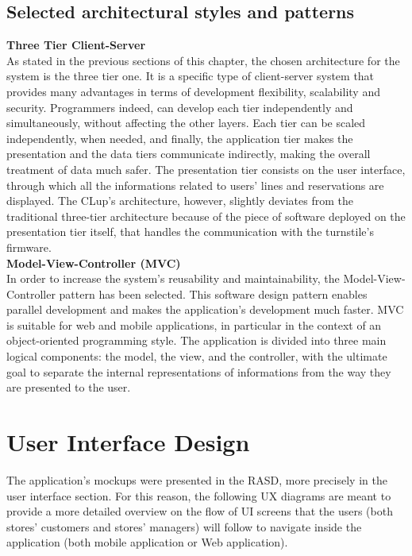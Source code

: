 \documentclass{article}
\begin{document}
\subsection{Selected architectural styles and patterns}

\noindent\textbf{Three Tier Client-Server}\\

\noindent As stated in the previous sections of this chapter, the chosen architecture for the system is the three tier one. It is a specific type of client-server system that provides many advantages in terms of development flexibility, scalability and security. Programmers indeed, can develop each tier independently and simultaneously, without affecting the other layers. Each tier can be scaled independently, when needed, and finally, the application tier makes the presentation and the data tiers communicate indirectly, making the overall treatment of data much safer. The presentation tier consists on the user interface, through which all the informations related to users’ lines and reservations are displayed. The CLup’s architecture, however, slightly deviates from the traditional three-tier architecture because of the piece of software deployed on the presentation tier itself, that handles the communication with the turnstile’s firmware.\\

\textbf{Model-View-Controller (MVC)}\\

\noindent In order to increase the system’s reusability and maintainability, the Model-View-Controller pattern has been selected. This software design pattern enables parallel development and makes the application’s development much faster. MVC is suitable for web and mobile applications, in particular in the context of an object-oriented programming style. The application is divided into three main logical components: the model, the view, and the controller, with the ultimate goal to separate the internal representations of informations from the way they are presented to the user.




\section{User Interface Design}
The application's mockups were presented in the RASD, more precisely in the user interface section. For this reason, the following UX diagrams are meant to provide a more detailed overview on the flow of UI screens that the users (both stores' customers and stores' managers) will follow to navigate inside the application (both mobile application or Web application).
\end{document}
